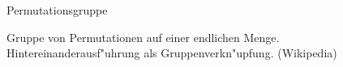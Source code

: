 \documentclass[class=article, crop=false]{standalone}
\begin{document}
\begin{zettel}{Permutationsgruppe}
\begin{flashcard}
    Gruppe von Permutationen auf einer endlichen Menge. Hintereinanderausf"uhrung als Gruppenverkn"upfung. (Wikipedia)
\end{flashcard}
\end{zettel}
\end{document}
